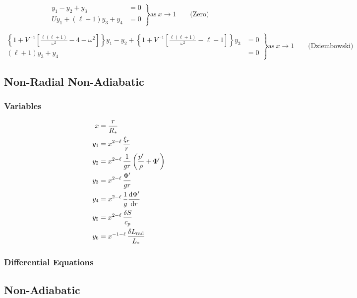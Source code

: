 \documentclass[fleqn]{article}
\newcommand{\diff}{\ensuremath{\mathrm{d}}}
\newcommand{\Rstar}{\ensuremath{R_{\ast}}}
\newcommand{\Lrad}{\ensuremath{L_{\rm rad}}}
\newcommand{\Lstar}{\ensuremath{L_{\ast}}}
\begin{document}
\begin{equation*}
\left.
\begin{aligned}
y_{1} - y_{2} + y_{3} &= 0 \\
U y_{1} + (\ell + 1) y_{3} + y_{4} &= 0
\end{aligned}
\right\}
\text{as}\ x \rightarrow 1 \qquad \text{(Zero)}
\end{equation*}

\begin{equation*}
\left.
\begin{aligned}
\left\{ 1 + V^{-1} \left[ \frac{\ell(\ell+1)}{\omega^{2}} - 4 - \omega^{2} \right] \right\} y_{1} -
y_{2} +
\left\{ 1 + V^{-1} \left[ \frac{\ell(\ell+1)}{\omega^{2}} - \ell - 1 \right] \right\} y_{3} &= 0 \\
(\ell + 1) y_{3} + y_{4} &= 0
\end{aligned}
\right\} 
\text{as}\ x \rightarrow 1 \qquad \text{(Dziembowski)}
\end{equation*}


\newpage

\subsection*{Non-Radial Non-Adiabatic}

\subsubsection*{Variables}

\begin{align*}
x     &= \frac{r}{\Rstar} \\
y_{1} &= x^{2-\ell}\, \frac{\xi_{r}}{r} \\
y_{2} &= x^{2-\ell}\, \frac{1}{gr} \left( \frac{p'}{\rho} + \Phi' \right)\\
y_{3} &= x^{2-\ell}\, \frac{\Phi'}{gr}\\
y_{4} &= x^{2-\ell}\, \frac{1}{g} \frac{\diff \Phi'}{\diff r}\\
y_{5} &= x^{2-\ell}\, \frac{\delta S}{c_{p}}\\
y_{6} &= x^{-1-\ell}\, \frac{\delta \Lrad}{\Lstar}
\end{align*}

\subsubsection*{Differential Equations}

\subsection*{Non-Adiabatic}
\end{document}
